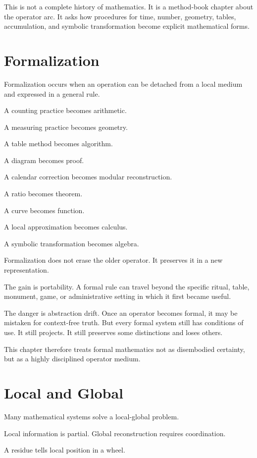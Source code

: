 \documentclass[11pt]{book}
\begin{document}
This is not a complete history of mathematics. It is a method-book chapter about the operator arc. It asks how procedures for time, number, geometry, tables, accumulation, and symbolic transformation become explicit mathematical forms.

\section{Formalization}

Formalization occurs when an operation can be detached from a local medium and expressed in a general rule.

A counting practice becomes arithmetic.

A measuring practice becomes geometry.

A table method becomes algorithm.

A diagram becomes proof.

A calendar correction becomes modular reconstruction.

A ratio becomes theorem.

A curve becomes function.

A local approximation becomes calculus.

A symbolic transformation becomes algebra.

Formalization does not erase the older operator. It preserves it in a new representation.

The gain is portability. A formal rule can travel beyond the specific ritual, table, monument, game, or administrative setting in which it first became useful.

The danger is abstraction drift. Once an operator becomes formal, it may be mistaken for context-free truth. But every formal system still has conditions of use. It still projects. It still preserves some distinctions and loses others.

This chapter therefore treats formal mathematics not as disembodied certainty, but as a highly disciplined operator medium.

\section{Local and Global}

Many mathematical systems solve a local-global problem.

Local information is partial. Global reconstruction requires coordination.

A residue tells local position in a wheel.
\end{document}
